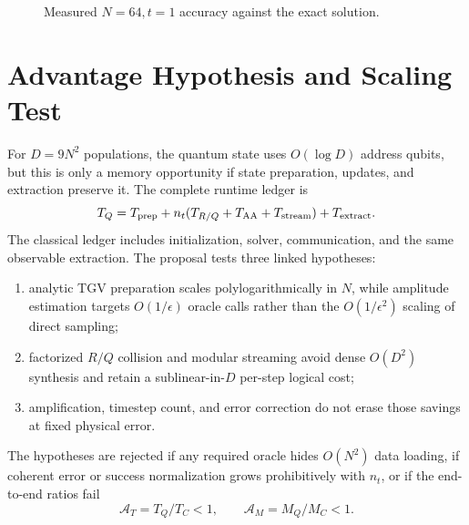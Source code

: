 \documentclass[10pt,twocolumn]{article}
\begin{document}
\begin{figure}[t]
\centering
{}
\caption{Measured $N=64,t=1$ accuracy against the exact solution.}
\label{fig:classical}
\end{figure}

\section{Advantage Hypothesis and Scaling Test}
For $D=9N^2$ populations, the quantum state uses
$O(\log D)$ address qubits, but this is only a memory opportunity if state
preparation, updates, and extraction preserve it. The complete runtime ledger
is
\begin{equation}
T_Q=T_{\rm prep}+n_t(T_{R/Q}+T_{\rm AA}+T_{\rm stream})+T_{\rm extract}.
\label{eq:ledger}
\end{equation}
The classical ledger includes initialization, solver, communication, and the
same observable extraction. The proposal tests three linked hypotheses:
\begin{enumerate}
\item analytic TGV preparation scales polylogarithmically in $N$, while
amplitude estimation targets $O(1/\epsilon)$ oracle calls rather than the
$O(1/\epsilon^2)$ scaling of direct sampling;
\item factorized $R/Q$ collision and modular streaming avoid dense
$O(D^2)$ synthesis and retain a sublinear-in-$D$ per-step logical cost;
\item amplification, timestep count, and error correction do not erase those
savings at fixed physical error.
\end{enumerate}
The hypotheses are rejected if any required oracle hides $O(N^2)$ data loading,
if coherent error or success normalization grows prohibitively with $n_t$, or
if the end-to-end ratios fail
\begin{equation}
\mathcal A_T=T_Q/T_C<1,\qquad \mathcal A_M=M_Q/M_C<1.
\end{equation}
\end{document}
